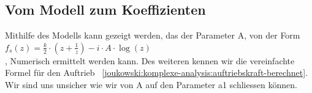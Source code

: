 	\subsection{Vom Modell zum Koeffizienten}
		Mithilfe des Modells kann gezeigt werden, das der Parameter A, von der Form 	$f_s(z) = \frac{k}{2}\cdot(z+\frac{1}{z})-i\cdot A\cdot \log(z)$ \\, Numerisch ermittelt werden kann. Des weiteren kennen wir die vereinfachte Formel für den Auftrieb ~\eqref{joukowski:komplexe-analysis:auftriebskraft-berechnet}. Wir sind uns unsicher wie wir von A auf den Parameter a1 schliessen können.
	